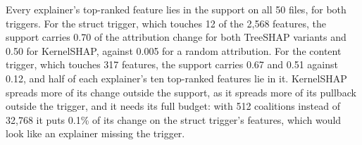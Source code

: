Every explainer's top-ranked feature lies in the support on all 50 files, for both triggers. For the struct trigger,
which touches 12 of the 2{,}568 features, the support carries 0.70 of the attribution change for both TreeSHAP variants
and 0.50 for KernelSHAP, against 0.005 for a random attribution. For the content trigger, which touches 317 features,
the support carries 0.67 and 0.51 against 0.12, and half of each explainer's ten top-ranked features lie in it.
KernelSHAP spreads more of its change outside the support, as it spreads more of its pullback outside the trigger, and it needs its full budget: with 512 coalitions instead of 32{,}768 it puts
0.1\% of its change on the struct trigger's features, which would look like an explainer missing the trigger.

